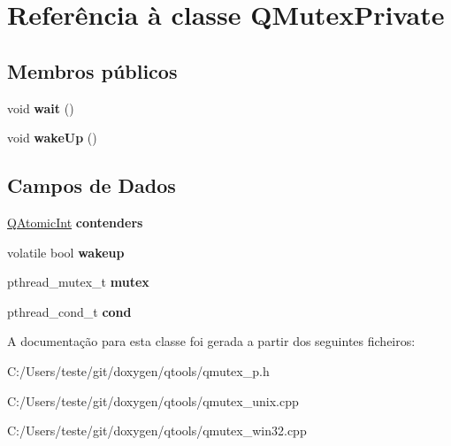 \hypertarget{class_q_mutex_private}{\section{Referência à classe Q\-Mutex\-Private}
\label{class_q_mutex_private}
}
\subsection*{Membros públicos}
\begin{DoxyCompactItemize}
\item 
\hypertarget{class_q_mutex_private_aa3b21853f890838c88d047d6c2786917}{void {\bfseries wait} ()}\label{class_q_mutex_private_aa3b21853f890838c88d047d6c2786917}

\item 
\hypertarget{class_q_mutex_private_a079d49a5302222debfe4dc54cf7a5c7a}{void {\bfseries wake\-Up} ()}\label{class_q_mutex_private_a079d49a5302222debfe4dc54cf7a5c7a}

\end{DoxyCompactItemize}
\subsection*{Campos de Dados}
\begin{DoxyCompactItemize}
\item 
\hypertarget{class_q_mutex_private_a7d347113eca360e83cbbd8284ed94ff1}{\hyperlink{class_q_atomic_int}{Q\-Atomic\-Int} {\bfseries contenders}}\label{class_q_mutex_private_a7d347113eca360e83cbbd8284ed94ff1}

\item 
\hypertarget{class_q_mutex_private_ad87c1c66ff70d000954156a5d49cd6e5}{volatile bool {\bfseries wakeup}}\label{class_q_mutex_private_ad87c1c66ff70d000954156a5d49cd6e5}

\item 
\hypertarget{class_q_mutex_private_a4acff8232e4aec9cd5c6dc200ac55ef3}{pthread\-\_\-mutex\-\_\-t {\bfseries mutex}}\label{class_q_mutex_private_a4acff8232e4aec9cd5c6dc200ac55ef3}

\item 
\hypertarget{class_q_mutex_private_a0a1433271fddfed84bc959ae6c202e5a}{pthread\-\_\-cond\-\_\-t {\bfseries cond}}\label{class_q_mutex_private_a0a1433271fddfed84bc959ae6c202e5a}

\end{DoxyCompactItemize}


A documentação para esta classe foi gerada a partir dos seguintes ficheiros\-:\begin{DoxyCompactItemize}
\item 
C\-:/\-Users/teste/git/doxygen/qtools/qmutex\-\_\-p.\-h\item 
C\-:/\-Users/teste/git/doxygen/qtools/qmutex\-\_\-unix.\-cpp\item 
C\-:/\-Users/teste/git/doxygen/qtools/qmutex\-\_\-win32.\-cpp\end{DoxyCompactItemize}
